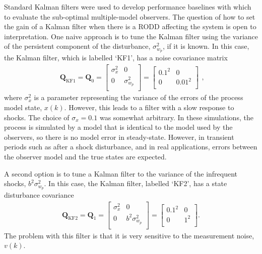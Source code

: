Standard Kalman filters were used to develop performance baselines with which to evaluate the sub-optimal multiple-model observers. The question of how to set the gain of a Kalman filter when there is a \gls{RODD} affecting the system is open to interpretation. One naive approach is to tune the Kalman filter using the variance of the persistent component of the disturbance, $\sigma_{w_p}^2$, if it is known. In this case, the Kalman filter, which is labelled `KF1', has a noise covariance matrix
\begin{equation} \label{eq:sim-sys-siso-KF1-Q}
	\begin{aligned}
		\mathbf{Q}_{\text{KF1}}=\mathbf{Q}_0=\begin{bmatrix}
			\sigma_{x}^2 & 0 \\
			0 &  \sigma_{w_p}^2 \\
		\end{bmatrix}=\begin{bmatrix}
		0.1^2 & 0 \\
		0 & 0.01^2 \\
	\end{bmatrix}
	\end{aligned},
\end{equation}
where $\sigma_{x}^2$ is a parameter representing the variance of the errors of the process model state, $x(k)$. However, this leads to a filter with a slow response to shocks. The choice of $\sigma_{x}=0.1$ was somewhat arbitrary. In these simulations, the process is simulated by a model that is identical to the model used by the observers, so there is no model error in steady-state. However, in transient periods such as after a shock disturbance, and in real applications, errors between the observer model and the true states are expected.

A second option is to tune a Kalman filter to the variance of the infrequent shocks, $b^2\sigma_{w_p}^2$.  In this case, the Kalman filter, labelled `KF2', has a state disturbance covariance
\begin{equation} \label{eq:sim-sys-siso-KF2-Q}
	\begin{aligned}
		\mathbf{Q}_{\text{KF2}}=\mathbf{Q}_1=\begin{bmatrix}
			\sigma_{x}^2 & 0 \\
			0 & b^2\sigma_{w_p}^2 \\
		\end{bmatrix}=\begin{bmatrix}
			0.1^2 & 0 \\
			0 & 1^2 \\
		\end{bmatrix}.
	\end{aligned}
\end{equation}
The problem with this filter is that it is very sensitive to the measurement noise, $v(k)$. 

